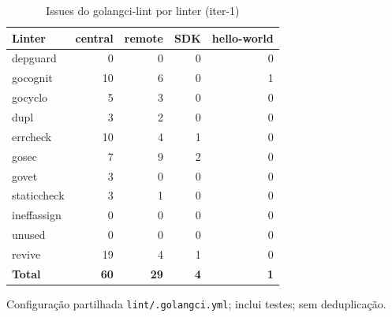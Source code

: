 \begin{table}[htbp]
  \centering\small
  \caption{Issues do golangci-lint por linter (iter-1)}
  \label{tab:iter-1-lint}
  \begin{tabular}{lrrrr}
    \toprule
    Linter & central & remote & SDK & hello-world \\
    \midrule
    depguard & 0 & 0 & 0 & 0 \\
    gocognit & 10 & 6 & 0 & 1 \\
    gocyclo & 5 & 3 & 0 & 0 \\
    dupl & 3 & 2 & 0 & 0 \\
    errcheck & 10 & 4 & 1 & 0 \\
    gosec & 7 & 9 & 2 & 0 \\
    govet & 3 & 0 & 0 & 0 \\
    staticcheck & 3 & 1 & 0 & 0 \\
    ineffassign & 0 & 0 & 0 & 0 \\
    unused & 0 & 0 & 0 & 0 \\
    revive & 19 & 4 & 1 & 0 \\
    \textbf{Total} & \textbf{60} & \textbf{29} & \textbf{4} & \textbf{1} \\
    \bottomrule
  \end{tabular}
  \par\smallskip\footnotesize Configuração partilhada \texttt{lint/.golangci.yml}; inclui testes; sem deduplicação.
\end{table}
